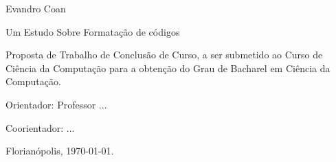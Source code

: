 


\begin{titlepage}

    \center




    Evandro Coan



    \bigskip
    Um Estudo Sobre Formatação de códigos\\[3cm]

    \begin{flushright}

        \begin{minipage}{0.518\textwidth}

            Proposta de Trabalho de Conclusão de Curso,
            a ser submetido ao Curso de Ciência da Computação
            para a obtenção do Grau de Bacharel em Ciência da Computação.

            \medskip
            Orientador: Professor ...

            \medskip
            Coorientador: ...

        \end{minipage}

    \end{flushright}


    Florianópolis, \today.

\end{titlepage}






